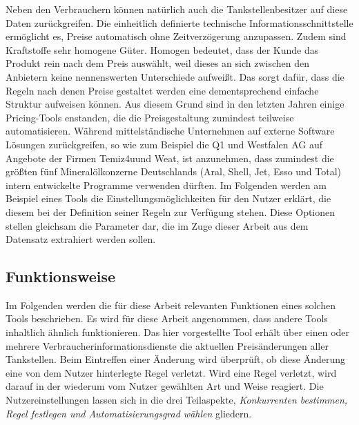 Neben den Verbrauchern können natürlich auch die Tankstellenbesitzer auf diese Daten zurückgreifen. Die einheitlich definierte technische Informationsschnittstelle ermöglicht es, Preise automatisch ohne Zeitverzögerung anzupassen. Zudem sind Kraftstoffe sehr homogene Güter. Homogen bedeutet, dass der Kunde das Produkt rein nach dem Preis auswählt, weil dieses an sich zwischen den Anbietern keine nennenswerten Unterschiede aufweißt. Das sorgt dafür, dass die Regeln nach denen Preise gestaltet werden eine dementsprechend einfache Struktur aufweisen können. Aus diesem Grund sind in den letzten Jahren einige Pricing-Tools enstanden, die die Preisgestaltung zumindest teilweise automatisieren. Während mittelständische Unternehmen auf externe Software Lösungen zurückgreifen, so wie zum Beispiel die Q1 und Westfalen AG auf Angebote der Firmen Temiz4u\footnotemark[1] und Weat\footnotemark[2], ist anzunehmen, dass zumindest die größten fünf Mineralölkonzerne Deutschlands (Aral, Shell, Jet, Esso und Total) intern entwickelte Programme verwenden dürften. Im Folgenden werden am Beispiel eines Tools die Einstellungsmöglichkeiten für den  Nutzer erklärt, die diesem bei der Definition seiner Regeln zur Verfügung stehen. Diese Optionen stellen gleichsam die Parameter dar, die im Zuge dieser Arbeit aus dem Datensatz extrahiert werden sollen.


\subsection{Funktionsweise}
Im Folgenden werden die für diese Arbeit relevanten Funktionen eines solchen Tools beschrieben. Es wird für diese Arbeit angenommen, dass andere Tools inhaltlich ähnlich funktionieren. Das hier vorgestellte Tool erhält über einen oder mehrere Verbraucherinformationsdienste die aktuellen Preisänderungen aller Tankstellen. Beim Eintreffen einer Änderung wird überprüft, ob diese Änderung eine von dem Nutzer hinterlegte Regel verletzt. Wird eine Regel verletzt, wird darauf in der wiederum vom Nutzer gewählten Art und Weise reagiert. Die Nutzereinstellungen lassen sich in die drei Teilaspekte, \textit{Konkurrenten bestimmen, Regel festlegen und Automatisierungsgrad wählen} gliedern. 

